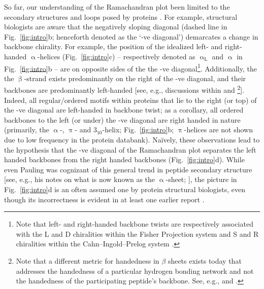 \documentclass[fleqn,10pt]{wlpeerj} %
\newcommand{\Fig}[1]{Fig.~\ref{#1}}
\begin{document}
So far, our understanding of the Ramachandran plot been limited to the secondary structures and loops posed by proteins \citep{Berman2000}. For example, structural biologists are aware that the negatively sloping diagonal (dashed line in \Fig{fig:intro}b; henceforth denoted as the `-ve diagonal') demarcates a change in backbone chirality. For example, the position of the idealized left- and right-handed $\upalpha$-helices (\Fig{fig:intro}c) -- respectively denoted as $\upalpha_\textrm{L}$ and $\upalpha$ in \Fig{fig:intro}b -- are on opposite sides of the the -ve diagonal\footnote{Note that left- and right-handed backbone twists are respectively associated with the L and D chiralities within the Fisher Projection system and S and R chiralities within the Cahn--Ingold--Prelog system \citep{Cross2013}.}. Additionally, the the $\upbeta$-strand exists predominantly on the right of the -ve diagonal, and their backbones are predominantly left-handed [see, e.g., discussions within \cite{Quiocho1977} and \cite{Shaw1977}\footnote{Note that a different metric for handedness in $\beta$ sheets exists today that addresses the handedness of a particular hydrogen bonding network and not the handedness of the participating peptide's backbone. See, e.g., \cite{Schulz1974} and \cite{Chothia1977}.}]. Indeed, all regular/ordered motifs within proteins that lie to the right (or top) of the -ve diagonal are left-handed in backbone twist; as a corollary, all ordered backbones to the left (or under) the -ve diagonal are right handed in nature (primarily, the $\upalpha$-, $\uppi$- and $3_{10}$-helix; \Fig{fig:intro}b; $\uppi$-helices are not shown due to low frequency in the protein databank). Na{\"i}vely, these observations lead to the hypothesis that the -ve diagonal of the Ramachandran plot separates the left handed backbones from the right handed backbones (\Fig{fig:intro}d). While even Pauling was cognizant of this general trend in peptide secondary structure [see, e.g., his notes on what is now known as the $\upalpha$-sheet; \cite{Pauling1951,Pauling1951a,Pauling1951b}], the picture in \Fig{fig:intro}d is an often assumed one by protein structural biologists, even though its incorrectness is evident in at least one earlier report \citep{Zacharias2013}.
\end{document}
